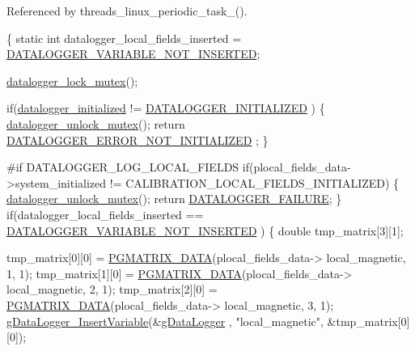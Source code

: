 Referenced by threads\-\_\-linux\-\_\-periodic\-\_\-task\-\_().


\begin{DoxyCode}
\{
    \textcolor{keyword}{static} \textcolor{keywordtype}{int} datalogger\_local\_fields\_inserted = 
      \hyperlink{datalogger_01_07Caio-PC's_01conflicted_01copy_012012-11-23_08_8h_a1f4fd2dbd981cf35467ab688c9157a74}{DATALOGGER\_VARIABLE\_NOT\_INSERTED};

    \hyperlink{datalogger_01_07Caio-PC's_01conflicted_01copy_012012-11-23_08_8c_a54b06d9395b2e370a5a72beb7f9524b2}{datalogger\_lock\_mutex}();

    \textcolor{keywordflow}{if}(\hyperlink{datalogger_01_07Caio-PC's_01conflicted_01copy_012012-11-23_08_8c_a35e8fbe04b90452afdc3c1be16ff6187}{datalogger\_initialized} != \hyperlink{datalogger_01_07Caio-PC's_01conflicted_01copy_012012-11-23_08_8h_a684c343d340004b77ca2b782934c96ca}{DATALOGGER\_INITIALIZED}
      )
    \{
        \hyperlink{datalogger_01_07Caio-PC's_01conflicted_01copy_012012-11-23_08_8c_a85453211c0c809083c36cc56b275aeeb}{datalogger\_unlock\_mutex}();
        \textcolor{keywordflow}{return} \hyperlink{datalogger_01_07Caio-PC's_01conflicted_01copy_012012-11-23_08_8h_a60df7fe0e61b757ad6a9db106b0eb43e}{DATALOGGER\_ERROR\_NOT\_INITIALIZED}
      ;
    \}

\textcolor{preprocessor}{    #if DATALOGGER\_LOG\_LOCAL\_FIELDS}
\textcolor{preprocessor}{}    \textcolor{keywordflow}{if}(plocal\_fields\_data->system\_initialized != 
      CALIBRATION\_LOCAL\_FIELDS\_INITIALIZED)
    \{
        \hyperlink{datalogger_01_07Caio-PC's_01conflicted_01copy_012012-11-23_08_8c_a85453211c0c809083c36cc56b275aeeb}{datalogger\_unlock\_mutex}();
        \textcolor{keywordflow}{return} \hyperlink{datalogger_01_07Caio-PC's_01conflicted_01copy_012012-11-23_08_8h_ac52138ca42979f6e1f1d589020ff9f83}{DATALOGGER\_FAILURE};
    \}
    \textcolor{keywordflow}{if}(datalogger\_local\_fields\_inserted == \hyperlink{datalogger_01_07Caio-PC's_01conflicted_01copy_012012-11-23_08_8h_a1f4fd2dbd981cf35467ab688c9157a74}{DATALOGGER\_VARIABLE\_NOT\_INSERTED}
      )
    \{
        \textcolor{keywordtype}{double} tmp\_matrix[3][1];

        tmp\_matrix[0][0] = \hyperlink{gmatrix_8h_a7333180c47234295df2bd7b09ac00da8}{PGMATRIX\_DATA}(plocal\_fields\_data->
      local\_magnetic, 1, 1);
        tmp\_matrix[1][0] = \hyperlink{gmatrix_8h_a7333180c47234295df2bd7b09ac00da8}{PGMATRIX\_DATA}(plocal\_fields\_data->
      local\_magnetic, 2, 1);
        tmp\_matrix[2][0] = \hyperlink{gmatrix_8h_a7333180c47234295df2bd7b09ac00da8}{PGMATRIX\_DATA}(plocal\_fields\_data->
      local\_magnetic, 3, 1);
        \hyperlink{gdatalogger_8c_a32674e7c2afa8b78e99a0070cf4bcaf9}{gDataLogger\_InsertVariable}(&\hyperlink{datalogger_01_07Caio-PC's_01conflicted_01copy_012012-11-23_08_8c_abe3b9c2c4e21e79c7b046b5986d13acc}{gDataLogger}
      , \textcolor{stringliteral}{"local\_magnetic"}, &tmp\_matrix[0][0]);


\end{DoxyCode}
